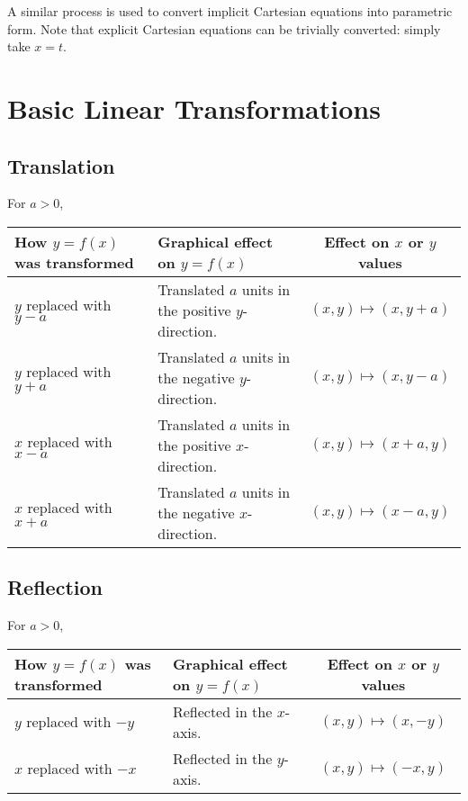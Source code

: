 A similar process is used to convert implicit Cartesian equations into parametric form. Note that explicit Cartesian equations can be trivially converted: simply take $x = t$.

\section{Basic Linear Transformations}

\subsection{Translation}

For $a > 0$,

\begin{table}[H]
    \centering
    \begin{tabularx}{\columnwidth}{|>{\centering\arraybackslash}X|>{\centering\arraybackslash}X|c|}
    \hline
    \textbf{How $y = f(x)$ was transformed} & \textbf{Graphical effect on $y = f(x)$} & \textbf{Effect on $x$ or $y$ values} \\ \hline\hline
    $y$ replaced with $y-a$ & Translated $a$ units in the positive $y$-direction. & $(x, y) \mapsto (x, y + a)$ \\ \hline
    $y$ replaced with $y+a$ & Translated $a$ units in the negative $y$-direction. & $(x, y) \mapsto (x, y - a)$ \\ \hline
    $x$ replaced with $x-a$ & Translated $a$ units in the positive $x$-direction. & $(x, y) \mapsto (x + a, y)$ \\ \hline
    $x$ replaced with $x+a$ &  Translated $a$ units in the negative $x$-direction. & $(x, y) \mapsto (x - a, y)$ \\ \hline
    \end{tabularx}
\end{table}

\subsection{Reflection}

For $a > 0$,

\begin{table}[H]
    \centering
    \begin{tabularx}{\columnwidth}{|>{\centering\arraybackslash}X|>{\centering\arraybackslash}X|c|}
    \hline
    \textbf{How $y = f(x)$ was transformed} & \textbf{Graphical effect on $y = f(x)$} & \textbf{Effect on $x$ or $y$ values} \\ \hline\hline
    $y$ replaced with $-y$ & Reflected in the $x$-axis. & $(x, y) \mapsto (x, -y)$ \\ \hline
    $x$ replaced with $-x$ & Reflected in the $y$-axis. & $(x, y) \mapsto (-x, y)$ \\ \hline
    \end{tabularx}
\end{table}


